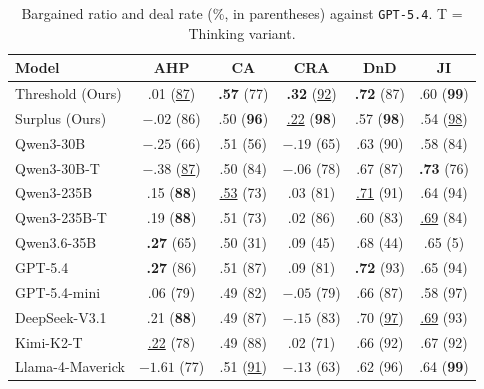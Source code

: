 \documentclass[11pt]{article}
\newcommand{\model}[1]{\texttt{#1}}
\newcommand{\lightrule}{\arrayrulecolor{black!20}\midrule\arrayrulecolor{black}}
\begin{document}
\begin{table}[ht]
\centering
\scriptsize
\setlength{\tabcolsep}{3pt}
\renewcommand{\arraystretch}{1.15}
\begin{tabular}{l c c c c c}
\toprule
\rowcolor{tableheader}
\textbf{Model} & \textbf{AHP} & \textbf{CA} & \textbf{CRA} & \textbf{DnD} & \textbf{JI} \\
\midrule
\rowcolor{tablerow}
Threshold (Ours) & .01 (\underline{87}) & \textbf{.57} (77) & \textbf{.32} (\underline{92}) & \textbf{.72} (87) & .60 (\textbf{99}) \\
Surplus (Ours)   & $-.02$ (86)          & .50 (\textbf{96})  & \underline{.22} (\textbf{98})  & .57 (\textbf{98})  & .54 (\underline{98}) \\
\lightrule
\rowcolor{tablerow}
Qwen3-30B        & $-.25$ (66)          & .51 (56)           & $-.19$ (65)          & .63 (90)           & .58 (84)          \\
Qwen3-30B-T      & $-.38$ (\underline{87}) & .50 (84)        & $-.06$ (78)          & .67 (87)           & \textbf{.73} (76) \\
\rowcolor{tablerow}
Qwen3-235B       & .15 (\textbf{88})    & \underline{.53} (73) & .03 (81)          & \underline{.71} (91) & .64 (94)        \\
Qwen3-235B-T     & .19 (\textbf{88})    & .51 (73)           & .02 (86)             & .60 (83)           & \underline{.69} (84) \\
\rowcolor{tablerow}
Qwen3.6-35B      & \textbf{.27} (65)    & .50 (31)           & .09 (45)             & .68 (44)           & .65 (5)           \\
GPT-5.4          & \textbf{.27} (86)    & .51 (87)           & .09 (81)             & \textbf{.72} (93)  & .65 (94)          \\
GPT-5.4-mini     & .06 (79)             & .49 (82)           & $-.05$ (79)          & .66 (87)           & .58 (97)          \\
\rowcolor{tablerow}
DeepSeek-V3.1    & .21 (\textbf{88})    & .49 (87)           & $-.15$ (83)          & .70 (\underline{97}) & \underline{.69} (93) \\
Kimi-K2-T        & \underline{.22} (78) & .49 (88)           & .02 (71)             & .66 (92)           & .67 (92)          \\
\rowcolor{tablerow}
Llama-4-Maverick & $-1.61$ (77)         & .51 (\underline{91}) & $-.13$ (63)        & .62 (96)           & .64 (\textbf{99}) \\
\bottomrule
\end{tabular}
\caption{Bargained ratio and deal rate (\%, in parentheses) against \model{GPT-5.4}. T = Thinking variant.}
\label{tab:results-gpt}
\end{table}
\end{document}
